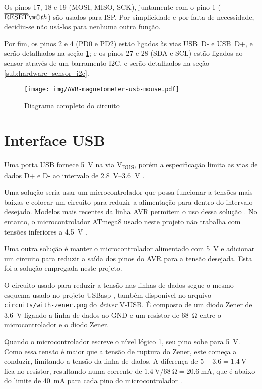 \documentclass[brazil,pagestart=firstchapter]{abnt}
\makeatletter
\newcommand*{\textoverline}[1]{$\overline{\hbox{#1}}\m@th$}
\newcommand*{\VBUS}{V\textsubscript{BUS}\xspace}
\newcommand*{\GND}{GND\xspace}
\newcommand*{\VUSB}{\mbox{V-USB}\xspace}
\makeatother
\begin{document}
Os pinos 17, 18 e 19 (MOSI, MISO, SCK), juntamente com o pino 1
(\textoverline{RESET}) são usados para \ac{ISP}. Por simplicidade e por
falta de necessidade, decidiu-se não usá-los para nenhuma outra função.

Por fim, os pinos 2 e 4 (PD0 e PD2) estão ligados às vias USB~D- e USB~D+, e
serão detalhados na seção \ref{sec:hardware_usb}; e os pinos 27 e 28 (SDA e
SCL) estão ligados ao sensor através de um barramento \ac{I2C}, e serão
detalhados na seção \ref{sub:hardware_sensor_i2c}.

\begin{figure}[h]
\centering
\texttt{[image: img/AVR-magnetometer-usb-mouse.pdf]}
\caption{Diagrama completo do circuito}
\label{fig:circuito_completo}
\end{figure}


\section{Interface USB}
\label{sec:hardware_usb}

Uma porta \ac{USB} fornece \SI{5}{\volt} na via \VBUS, porém a especificação
limita as vias de dados D+ e D- ao intervalo de \SIrange{2.8}{3.6}{\volt}
\cite{usb20}.

Uma solução seria usar um microcontrolador que possa funcionar a tensões
mais baixas e colocar um circuito para reduzir a alimentação para dentro do
intervalo desejado. Modelos mais recentes da linha AVR permitem o uso dessa
solução \cite{ATmega_newer_datasheets}. No entanto, o
microcontrolador ATmega8 usado neste projeto não trabalha com tensões
inferiores a \SI{4.5}{\volt} \cite{ATmega8}.

Uma outra solução é manter o microcontrolador alimentado com \SI{5}{\volt} e
adicionar um circuito para reduzir a saída dos pinos do AVR para a tensão
desejada. Esta foi a solução empregada neste projeto.

O circuito usado para reduzir a tensão nas linhas de dados segue o mesmo
esquema usado no projeto USBasp \cite{USBasp}, também disponível no arquivo
\texttt{circuits/with-zener.png} do \textit{driver} \VUSB \cite{VUSBdriver}.
É composto de um diodo Zener de \SI{3.6}{\volt} ligando a linha de dados ao
\GND e um resistor de \SI{68}{\ohm} entre o microcontrolador e o diodo
Zener.

Quando o microcontrolador escreve o nível lógico 1, seu pino sobe para
\SI{5}{\volt}. Como essa tensão é maior que a tensão de ruptura do Zener,
este começa a conduzir, limitando a tensão da linha de dados. A diferença de
$\num{5} - \num{3.6} = \SI{1.4}{\volt}$ fica no resistor, resultando numa
corrente de $\SI{1.4}{\volt} / \SI{68}{\ohm} = \SI{20.6}{\milli\ampere}$,
que é abaixo do limite de \SI{40}{\milli\ampere} para cada pino do
microcontrolador \cite{ATmega8}.
\end{document}
